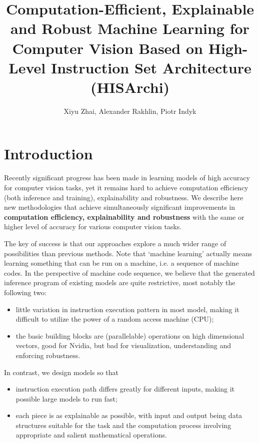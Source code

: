 \documentclass[10pt, oneside]{article}   	%
\title{Computation-Efficient, Explainable and Robust Machine Learning for Computer Vision Based on High-Level Instruction Set Architecture (HISArchi)}
\author{Xiyu Zhai, Alexander Rakhlin, Piotr Indyk}
\date{}							%
\theoremstyle{definition}
\begin{document}
\maketitle
\tableofcontents
{}

\section{Introduction}

Recently significant progress has been made in learning models of high accuracy for computer vision tasks, yet it remains hard to achieve computation efficiency (both inference and training), explainability and robustness.
We describe here new methodologies that achieve simultaneously significant improvements in \textbf{computation efficiency, explainability and robustness} with the same or higher level of accuracy for various computer vision tasks.

The key of success is that our approaches explore a much wider range of possibilities than previous methods. Note that `machine learning' actually means learning something that can be run on a machine, i.e. a sequence of machine codes. In the perspective of machine code sequence, we believe that the generated inference program of existing models are quite restrictive, most notably the following two:
\begin{itemize}
	\item little variation in instruction execution pattern in most model, making it difficult to utilize the power of a random access machine (CPU);
	\item the basic building blocks are (parallelable) operations on high dimensional vectors, good for Nvidia, but bad for visualization, understanding and enforcing robustness.
\end{itemize}

In contrast, we design models so that
\begin{itemize}
	\item instruction execution path differs greatly for different inputs, making it possible large models to run fast;
	\item each piece is as explainable as possible, with input and output being data structures suitable for the task and the computation process involving appropriate and salient mathematical operations.
\end{itemize}
\end{document}
